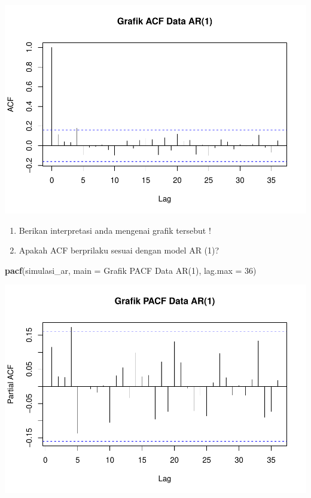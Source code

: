 \documentclass[
]{book}
\newenvironment{Shaded}{\begin{snugshade}}{\end{snugshade}}
\newcommand{\AttributeTok}[1]{\textcolor[rgb]{0.13,0.29,0.53}{#1}}
\newcommand{\DecValTok}[1]{\textcolor[rgb]{0.00,0.00,0.81}{#1}}
\newcommand{\FunctionTok}[1]{\textcolor[rgb]{0.13,0.29,0.53}{\textbf{#1}}}
\newcommand{\NormalTok}[1]{#1}
\newcommand{\StringTok}[1]{\textcolor[rgb]{0.31,0.60,0.02}{#1}}
\begin{document}
\begin{center}\includegraphics{_main_files/figure-latex/acf AR-1} \end{center}
\begin{jp}{}{}
\begin{enumerate}
\item Berikan interpretasi anda mengenai grafik tersebut !  
\item Apakah ACF berprilaku sesuai dengan model AR (1)?
\end{enumerate}
\end{jp}

\begin{Shaded}
\begin{Highlighting}[]
\FunctionTok{pacf}\NormalTok{(simulasi\_ar, }\AttributeTok{main =} \StringTok{\textquotesingle{}Grafik PACF Data AR(1)\textquotesingle{}}\NormalTok{, }
  \AttributeTok{lag.max =} \DecValTok{36}\NormalTok{)}
\end{Highlighting}
\end{Shaded}

\begin{center}\includegraphics{_main_files/figure-latex/pacf AR-1} \end{center}
\end{document}
